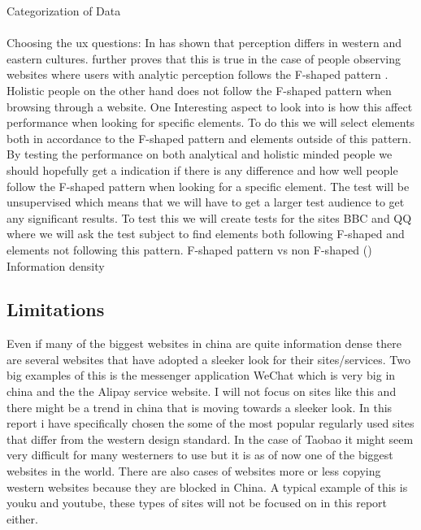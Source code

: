   Categorization of Data
  \\\\
  Choosing the ux questions:
  In \cite{Holistic_vs_Analytic} has shown that perception differs in western and eastern cultures. \cite{cross_web} further proves that this is true in the case of people observing websites where users with analytic perception follows the F-shaped pattern \cite{pernice2014people}. Holistic people on the other hand does not follow the F-shaped pattern when browsing through a website. \cite{cross_web} One Interesting aspect to look into is how this affect performance when looking for specific elements. To do this we will select elements both in accordance to the F-shaped pattern and elements outside of this pattern. By testing the performance on both analytical and holistic minded people we should hopefully get a indication if there is any difference and how well people follow the F-shaped pattern when looking for a specific element. The test will be unsupervised which means that we will have to get a larger test audience to get any significant results. To test this we will create tests for the sites BBC and QQ where we will ask the test subject to find elements both following F-shaped and elements not following this pattern.
  F-shaped pattern vs non F-shaped (\cite{cross_web})
  Information density
   
 \subsection{Limitations}
 Even if many of the biggest websites in china are quite information dense there are several websites that have adopted a sleeker look for their sites/services. Two big examples of this is the messenger application WeChat which is very big in china and the the Alipay service website. I will not focus on sites like this and there might be a trend in china that is moving towards a sleeker look. In this report i have specifically chosen the some of the most popular regularly used sites that differ from the western design standard. In the case of Taobao it might seem very difficult for many westerners to use but it is as of now one of the biggest websites in the world. There are also cases of websites more or less copying western websites because they are blocked in China. A typical example of this is youku and youtube, these types of sites will not be focused on in this report either.
